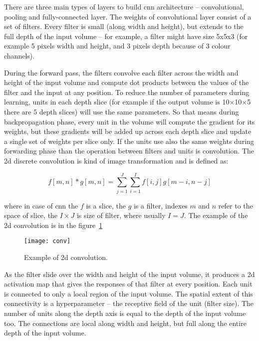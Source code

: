 \documentclass[thesis=M,english]{FITthesis}[2012/10/20]
\begin{document}
There are three main types of layers to build \gls{cnn} architecture -- convolutional, pooling and fully-connected layer. The weights of convolutional layer consist of a set of filters. Every filter is small (along width and height), but extends to the full depth of the input volume -- for example, a filter might have size 5x5x3 (for example 5 pixels width and height, and 3 pixels depth because of 3 colour channels). 

During the forward pass, the filters convolve each filter across the width and height of the input volume and compute dot products between the values of the filter and the input at any position. To reduce the number of parameters during learning, units in each depth slice (for example if the output volume is 10$\times$10$\times$5 there are 5 depth slices) will use the same parameters. So that means during backpropagation phase, every unit in the volume will compute the gradient for its weights, but these gradients will be added up across each depth slice and update a single set of weights per slice only. If the units use also the same weights during forwarding phase than the operation between filters and units is convolution.\cite{Johnson2017cnn} The \gls{2d} discrete convolution\cite{Ahn2014conv} is kind of image transformation and is defined as:

\begin{equation}
f[m, n] \ast g[m,n] = \sum_{j=1}^{J}\sum_{i=1}^{I} f[i,j]g[m-i, n-j]
\end{equation}

\noindent where in case of \gls{cnn} the $f$ is a slice, the $g$ is a filter, indexes $m$ and $n$ refer to the space of slice, the $I \times J$ is size of filter, where usually $I = J$. The example of the \gls{2d} convolution is in the figure~\ref{fig:convolution}

\begin{figure}[ht]\centering
    \texttt{[image: conv]}
    \caption{Example of \gls{2d} convolution.\cite{convolution}}\label{fig:convolution}
\end{figure}

As the filter slide over the width and height of the input volume, it produces a \gls{2d} activation map that gives the responses of that filter at every position. Each unit is connected to only a local region of the input volume. The spatial extent of this connectivity is a hyperparameter -- the receptive field of the unit (filter size). The number of units along the depth axis is equal to the depth of the input volume too. The connections are local along width and height, but full along the entire depth of the input volume.\cite{Johnson2017cnn}
\end{document}
